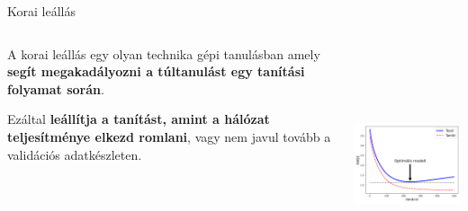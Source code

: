 \documentclass[english, aspectratio=169]{beamer}
\begin{document}
\begin{frame}{Korai leállás}
\begin{columns}
\begin{column}{.5\textwidth}
A korai leállás egy olyan technika gépi tanulásban amely \textbf{segít megakadályozni a túltanulást egy tanítási folyamat során}.\par\medskip
Ezáltal \textbf{leállítja a tanítást, amint a hálózat teljesítménye elkezd romlani}, vagy nem javul tovább a validációs adatkészleten.
\end{column}
\begin{column}{.5\textwidth}
\begin{center}
\includegraphics[width=7cm, height=7cm, keepaspectratio]{images/regularization_16.png}
\end{center}
\end{column}
\end{columns}
\end{frame}
\end{document}
